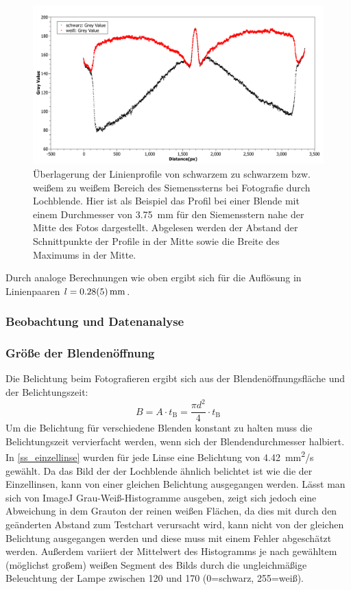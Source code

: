 \documentclass[
	a4paper,
	12pt,
	pagesize,
	ngerman
]{scrartcl}
\begin{document}
	\begin{figure}[H]  
		\includegraphics[width=1\textwidth]{fig_lochblende}
		\centering
		\caption{
		Überlagerung der Linienprofile von schwarzem zu schwarzem bzw. weißem zu weißem Bereich des Siemenssterns bei Fotografie durch Lochblende.
		Hier ist als Beispiel das Profil bei einer Blende mit einem Durchmesser von \SI{3,75}{mm} für den Siemensstern nahe der Mitte des Fotos dargestellt.
		Abgelesen werden der Abstand der Schnittpunkte der Profile in der Mitte sowie die Breite des Maximums in der Mitte.
		}
		\label{fig_lochblende_profil}
		\centering
	\end{figure}
	
	Durch analoge Berechnungen wie oben ergibt sich für die Auflösung in Linienpaaren $l = \SI{0.28\pm 0.05}{mm}$.
	
	\subsubsection{Beobachtung und Datenanalyse}




	\subsubsection*{Größe der Blendenöffnung}
	Die Belichtung beim Fotografieren ergibt sich aus der Blendenöffnungsfläche und der Belichtungszeit:
	\begin{equation}
		B = A \cdot t_\text{B} = \frac{\pi d^2}{4} \cdot t_\text{B}
	\end{equation}
	Um die Belichtung für verschiedene Blenden konstant zu halten muss die Belichtungszeit vervierfacht werden, wenn sich der Blendendurchmesser halbiert.
	In \cref{ss_einzellinse} wurden für jede Linse eine Belichtung von \SI{4,42}{mm^2/s} gewählt.
	Da das Bild der der Lochblende ähnlich belichtet ist wie die der Einzellinsen, kann von einer gleichen Belichtung ausgegangen werden.
	Lässt man sich von ImageJ Grau-Weiß-Histogramme ausgeben, zeigt sich jedoch eine Abweichung in dem Grauton der reinen weißen Flächen, da dies mit durch den geänderten Abstand zum Testchart verursacht wird, kann nicht von der gleichen Belichtung ausgegangen werden und diese muss mit einem Fehler abgeschätzt werden.
	Außerdem variiert der Mittelwert des Histogramms je nach gewähltem (möglichst großem) weißen Segment des Bilds durch die ungleichmäßige Beleuchtung der Lampe zwischen 120 und 170 (0=schwarz, 255=weiß).
\end{document}
